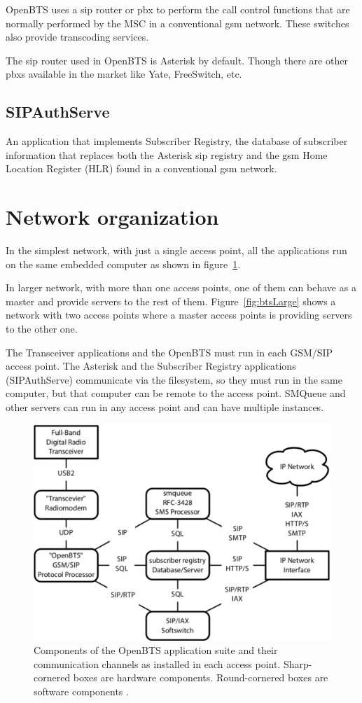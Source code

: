 OpenBTS uses a \gls{sip} router or \gls{pbx} to perform the 
call control functions that are normally performed by the MSC
in a conventional \gls{gsm} network. These switches also provide transcoding 
services.

The \gls{sip} router used in OpenBTS is Asterisk by default. Though there are other
\glspl{pbx} available in the market like Yate, FreeSwitch, etc.

\subsection{SIPAuthServe}
An application that implements Subscriber Registry, the database of subscriber 
information that replaces both the Asterisk \gls{sip} registry and the \gls{gsm} Home 
Location Register (HLR) found in a conventional \gls{gsm} network.

\section{Network organization}
In the simplest network, with just a single access point, all the applications run
on the same embedded computer as shown in figure~\ref{fig:btsSimple}.

In larger network, with more than one access points, one of them can behave as a master and provide servers to the rest of them.
Figure~\ref{fig:btsLarge} shows a network with two access points where
a master access points is providing servers to the other one.

The Transceiver applications and the OpenBTS must run in each GSM/SIP access point. 
The Asterisk and the Subscriber Registry applications (SIPAuthServe) 
communicate via the filesystem, so they must run in the same computer,
but that computer can be remote to the access point. 
SMQueue and other servers can run in any access point and can have 
multiple instances.
\begin{figure}
  \centering
    \includegraphics[width=\textwidth]{../images/btsSimple}
  \caption[Simplest OpenBTS network]{Components of the OpenBTS application suite 
  and their communication channels as installed in each
access point. Sharp-cornered boxes are hardware components.
Round-cornered boxes are software components \protect\cite{openbtsMan}.}
  \label{fig:btsSimple}
\end{figure}

